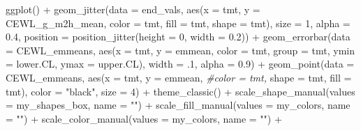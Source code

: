 \documentclass[
]{article}
\newenvironment{Shaded}{\begin{snugshade}}{\end{snugshade}}
\newcommand{\AttributeTok}[1]{\textcolor[rgb]{0.77,0.63,0.00}{#1}}
\newcommand{\CommentTok}[1]{\textcolor[rgb]{0.56,0.35,0.01}{\textit{#1}}}
\newcommand{\DecValTok}[1]{\textcolor[rgb]{0.00,0.00,0.81}{#1}}
\newcommand{\FloatTok}[1]{\textcolor[rgb]{0.00,0.00,0.81}{#1}}
\newcommand{\FunctionTok}[1]{\textcolor[rgb]{0.00,0.00,0.00}{#1}}
\newcommand{\NormalTok}[1]{#1}
\newcommand{\SpecialCharTok}[1]{\textcolor[rgb]{0.00,0.00,0.00}{#1}}
\newcommand{\StringTok}[1]{\textcolor[rgb]{0.31,0.60,0.02}{#1}}
\begin{document}
\begin{Shaded}
\begin{Highlighting}[]
\FunctionTok{ggplot}\NormalTok{() }\SpecialCharTok{+}
  \FunctionTok{geom\_jitter}\NormalTok{(}\AttributeTok{data =}\NormalTok{ end\_vals,}
              \FunctionTok{aes}\NormalTok{(}\AttributeTok{x =}\NormalTok{ tmt,}
                   \AttributeTok{y =}\NormalTok{ CEWL\_g\_m2h\_mean, }
                   \AttributeTok{color =}\NormalTok{ tmt,}
                 \AttributeTok{fill =}\NormalTok{ tmt,}
                 \AttributeTok{shape =}\NormalTok{ tmt), }
               \AttributeTok{size =} \DecValTok{1}\NormalTok{,}
              \AttributeTok{alpha =} \FloatTok{0.4}\NormalTok{,}
              \AttributeTok{position =} \FunctionTok{position\_jitter}\NormalTok{(}\AttributeTok{height =} \DecValTok{0}\NormalTok{, }\AttributeTok{width =} \FloatTok{0.2}\NormalTok{)) }\SpecialCharTok{+}
  \FunctionTok{geom\_errorbar}\NormalTok{(}\AttributeTok{data =}\NormalTok{ CEWL\_emmeans,}
                \FunctionTok{aes}\NormalTok{(}\AttributeTok{x =}\NormalTok{ tmt,}
                    \AttributeTok{y =}\NormalTok{ emmean, }
                    \AttributeTok{color =}\NormalTok{ tmt,}
                    \AttributeTok{group =}\NormalTok{ tmt,}
                    \AttributeTok{ymin =}\NormalTok{ lower.CL, }
                    \AttributeTok{ymax =}\NormalTok{ upper.CL),}
                \AttributeTok{width =}\NormalTok{ .}\DecValTok{1}\NormalTok{,}
                \AttributeTok{alpha =} \FloatTok{0.9}\NormalTok{) }\SpecialCharTok{+}
  \FunctionTok{geom\_point}\NormalTok{(}\AttributeTok{data =}\NormalTok{ CEWL\_emmeans, }
             \FunctionTok{aes}\NormalTok{(}\AttributeTok{x =}\NormalTok{ tmt,}
                   \AttributeTok{y =}\NormalTok{ emmean, }
                   \CommentTok{\#color = tmt,}
                 \AttributeTok{shape =}\NormalTok{ tmt,}
                 \AttributeTok{fill =}\NormalTok{ tmt), }
             \AttributeTok{color =} \StringTok{"black"}\NormalTok{,}
               \AttributeTok{size =} \DecValTok{4}\NormalTok{) }\SpecialCharTok{+}
  \FunctionTok{theme\_classic}\NormalTok{() }\SpecialCharTok{+} 
  \FunctionTok{scale\_shape\_manual}\NormalTok{(}\AttributeTok{values =}\NormalTok{ my\_shapes\_box, }\AttributeTok{name =} \StringTok{""}\NormalTok{) }\SpecialCharTok{+}
  \FunctionTok{scale\_fill\_manual}\NormalTok{(}\AttributeTok{values =}\NormalTok{ my\_colors, }\AttributeTok{name =} \StringTok{""}\NormalTok{) }\SpecialCharTok{+}
  \FunctionTok{scale\_color\_manual}\NormalTok{(}\AttributeTok{values =}\NormalTok{ my\_colors, }\AttributeTok{name =} \StringTok{""}\NormalTok{) }\SpecialCharTok{+}

\end{Highlighting}
\end{Shaded}
\end{document}
